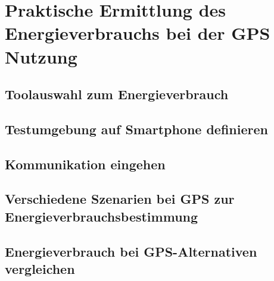 \chapter{Praktische Ermittlung des Energieverbrauchs bei der GPS Nutzung}

\section[Toolauswahl]{Toolauswahl zum Energieverbrauch}

\section[Testumgebung auf Smartphone definieren]{Testumgebung auf Smartphone
definieren}

\section[Kommunikation eingehen]{Kommunikation eingehen}

\section[Verschiedene Szenarien bei GPS zur
Energieverbrauchsbestimmung]{Verschiedene Szenarien bei GPS zur Energieverbrauchsbestimmung}

\section[Energieverbrauch bei GPS-Alternativen vergleichen]{Energieverbrauch bei
GPS-Alternativen vergleichen}
